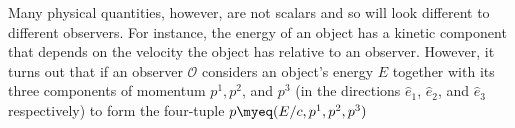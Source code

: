 \documentclass[12pt]{report}
\begin{document}
Many physical quantities, however, are not scalars and so will look different to different observers. For instance, the energy of an object has a kinetic component that depends on the velocity the object has relative to an observer. However, it turns out that if an observer $\mathcal{O}$ considers an object's energy $E$ 
 together with its three components of momentum $p^1, p^2$, and $p^3$ (in the directions $\hat{e}_1$, $\hat{e}_2$, and $\hat{e}_3$ respectively) to form the four-tuple $p\myeq(E/c, p^1, p^2, p^3)$ %
\end{document}
